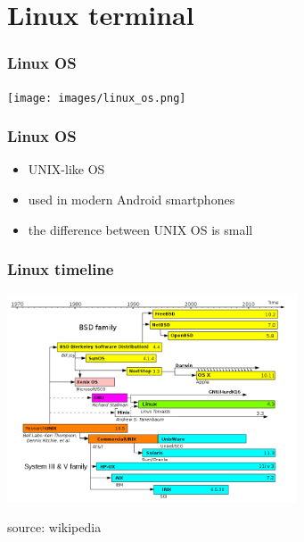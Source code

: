 %

\section{Linux terminal}

\begin{frame}
	\frametitle{Linux OS}
	
        \begin{center}
        \texttt{[image: images/linux\_os.png]}
        \end{center}
\end{frame}

\begin{frame}
	\frametitle{Linux OS}
	\begin{itemize}
		\item	UNIX-like OS 
		\item	used in modern Android smartphones
		\item   the difference between UNIX OS is small	
	\end{itemize}
	
\end{frame}

\begin{frame}
	\frametitle{Linux timeline}
        \begin{center}
        \includegraphics[width=8.6cm]{images/Unix_timeline.png}
        \end{center}
        {\tiny source: wikipedia}
\end{frame}

